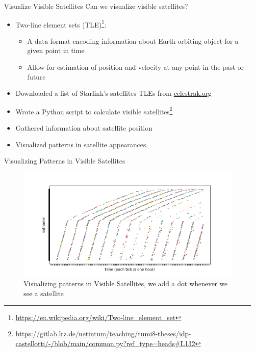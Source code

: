 \documentclass[NET,english,beameralt]{tumbeamer}
\begin{document}
\begin{frame}{Visualize Visible Satellites}
    Can we visualize visible satellites?
    \begin{itemize}
        \item Two-line element sets (TLE)\footnote{\url{https://en.wikipedia.org/wiki/Two-line_element_set}}: 
        \begin{itemize} 
            \item A data format encoding information about Earth-orbiting object for a given point in time
            \item Allow for estimation of position and velocity at any point in the past or future
        \end{itemize}     
        \item Downloaded a list of Starlink's satellites TLEs from \href{celestrak.org}{celestrak.org}
        \item Wrote a Python script to calculate visible
        satellites\footnote{\url{https://gitlab.lrz.de/netintum/teaching/tumi8-theses/idp-castellotti/-/blob/main/common.py?ref_type=heads\#L132}}
        \item Gathered information about satellite position
        \item Visualized patterns in satellite appearances.
    \end{itemize}
\end{frame}

\begin{frame}{Visualizing Patterns in Visible Satellites}
    \begin{figure}
        \includegraphics[width=1\textwidth]{pics/patterns-in-satellite-appearances.png}
        \caption{Visualizing patterns in Visible Satellites, we add a dot whenever we see a satellite}
    \end{figure}
\end{frame}
\end{document}

